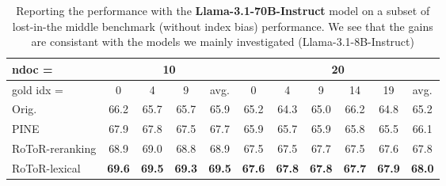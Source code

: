
\begin{table}[h]
\centering
\resizebox{0.6\linewidth}{!}
{
\begin{tabular}{@{}l|cccc|cccccc@{}}
\toprule
ndoc = & \multicolumn{4}{c|}{10} & \multicolumn{6}{c}{20} \\ \midrule
gold idx = & 0 & 4 & 9 & avg. & 0 & 4 & 9 & 14 & 19 & avg. \\ \midrule
Orig. & 66.2 & 65.7 & 65.7 & 65.9 & 65.2 & 64.3 & 65.0 & 66.2 & 64.8 & 65.2 \\
PINE & 67.9 & 67.8 & 67.5 & 67.7 & 65.9 & 65.7 & 65.9 & 65.8 & 65.5 & 66.1 \\
RoToR-reranking & 68.9 & 69.0 & 68.8 & 68.9 & 67.5 & 67.5 & 67.7 & 67.5 & 67.6 & 67.8 \\
RoToR-lexical & \textbf{69.6} & \textbf{69.5} & \textbf{69.3} & \textbf{69.5} & \textbf{67.6} & \textbf{67.8} & \textbf{67.8} & \textbf{67.7} & \textbf{67.9} & \textbf{68.0} \\
\bottomrule
\end{tabular}
}
\caption{Reporting the performance with the \textbf{Llama-3.1-70B-Instruct} model on a subset of lost-in-the middle benchmark (without index bias) performance. We see that the gains are consistant with the models we mainly investigated (Llama-3.1-8B-Instruct)}
\label{table/70bresult}

\end{table}
